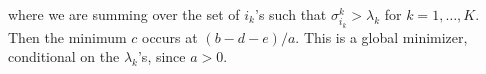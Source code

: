 where we are summing over the set of $i_k$'s such that $\sigma_{i_k}^k
> \lambda_k$ for $k = 1,\ldots,K$. Then the minimum $c$ occurs at $(b
- d - e)/a$. This is a global minimizer, conditional on the
$\lambda_k$'s, since $a > 0$.

